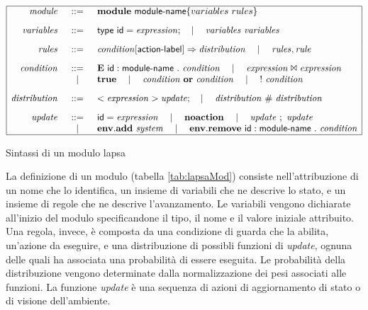 \begin{table} %
$$
\begin{array}{|rcl|}
\hline
\mathit{module} &::=& \mathbf{module} \mbox{ } {\sf module}\textrm{-}{\sf name} \{ variables \mbox{ } rules \}
	\\[.3cm]
\mathit{variables} &::=& {\sf type} \mbox{ } {\sf id} = \mathit{expression}; \quad\mid\quad \mathit{variables} \mbox{ } \mathit{variables}
	\\[.3cm]
\mathit{rules} &::=& \mathit{condition} [ {\sf action}\textrm{-}{\sf label}]\Rightarrow \mathit{distribution} \quad\mid\quad \mathit{rules},\mathit{rule}
	\\[.3cm]
\mathit{condition} &::=& \mathbf{E} \mbox{ } {\sf id}:{\sf module}\textrm{-}{\sf name} \mbox{ } . \mbox{ } \mathit{condition} \quad\mid\quad \mathit{expression} \Join \mathit{expression} \\
	& \quad\mid\quad & \mathbf{true} \quad\mid\quad \mathit{condition} \mbox{ } \mathbf{or} \mbox{ } \mathit{condition} \quad\mid\quad {\sf !} \mbox{ } \mathit{condition}
	\\[.3cm]
\mathit{distribution} &::=& <\mathit{expression}> \mathit{update}; \quad\mid\quad \mathit{distribution} \mbox{ } \# \mbox{ } \mathit{distribution}
	\\[.3cm]
\mathit{update} &::=& {\sf id} = \mathit{expression} \quad\mid\quad \mathbf{noaction} \quad\mid\quad \mathit{update} \mbox{ } ; \mbox{ } \mathit{update} \\
	& \quad\mid\quad & \mathbf{env.add} \mbox{ } \mathit{system} \quad\mid\quad \mathbf{env.remove} \mbox{ } {\sf id}:{\sf module}\textrm{-}{\sf name} \mbox{ } . \mbox{ } \mathit{condition} 
	\\
\hline
\end{array}
$$
\label{tab:lapsaMod}
\caption{Sintassi di un modulo \ac{lapsa}}
\end{table}

La definizione di un modulo (tabella \ref{tab:lapsaMod}) consiste nell'attribuzione di un nome che lo identifica, un insieme di variabili che ne descrive lo stato, e un insieme di regole che ne descrive l'avanzamento. Le variabili vengono dichiarate all'inizio del modulo specificandone il tipo, il nome e il valore iniziale attribuito. Una regola, invece, è composta da una condizione di guarda che la abilita, un'azione da eseguire, e una distribuzione di possibli funzioni di \emph{update}, ognuna delle quali ha associata una probabilità di essere eseguita. Le probabilità della distribuzione vengono determinate dalla normalizzazione dei pesi associati alle funzioni. La funzione \emph{update} è una sequenza di azioni di aggiornamento di stato o di visione dell'ambiente.

